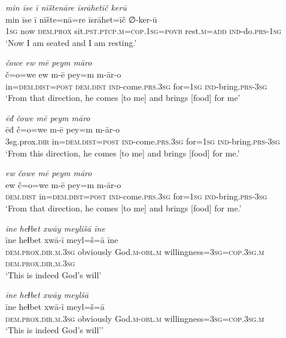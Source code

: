 \ea \label{PM.45}
\textit{min īse ī nīštenāre īsrāhetīč kerū} \\ 
\gll min īse ī nīšte=nā=re īsrāhet=īč ∅-ker-ū \\ 
 \textsc{1sg} now \textsc{dem.prox} sit\textsc{.pst}\textsc{.ptcp}\textsc{.m}\textsc{=cop}\textsc{.\textsc{1sg}}\textsc{=\textsc{povb}} rest\textsc{.m}\textsc{=add} \textsc{ind-}do\textsc{.prs}\textsc{-\textsc{1sg}} \\ 
\glt `Now I am seated and I am resting.'
\z 
 
\ea \label{PM.46}
\textit{čowe ew mē peym māro} \\ 
\gll č=o=we ew m-ē pey=m m-ār-o \\ 
 in=\textsc{dem.dist}\textsc{=\textsc{post}} \textsc{dem.dist} \textsc{ind-}come\textsc{.prs}\textsc{.3sg} for\textsc{=\textsc{1sg}} \textsc{ind-}bring\textsc{.prs}\textsc{-3sg} \\ 
\glt `From that direction, he  comes [to me] and brings [food] for me'
\z 
 
\ea \label{PM.47}
\textit{ēđ čowe mē peym māro} \\ 
\gll ēđ č=o=we m-ē pey=m m-ār-o \\ 
 3sg.prox\textsc{.dir} in=\textsc{dem.dist}\textsc{=\textsc{post}} \textsc{ind-}come\textsc{.prs}\textsc{.3sg} for\textsc{=\textsc{1sg}} \textsc{ind-}bring\textsc{.prs}\textsc{-3sg} \\ 
\glt `From this direction, he  comes [to me] and brings [food] for me.'
\z 
 
\ea \label{PM.48}
\textit{ew čowe mē peym māro} \\ 
\gll ew č=o=we m-ē pey=m m-ār-o \\ 
 \textsc{dem.dist} in=\textsc{dem.dist}\textsc{=\textsc{post}} \textsc{ind-}come\textsc{.prs}\textsc{.3sg} for\textsc{=\textsc{1sg}} \textsc{ind-}bring\textsc{.prs}\textsc{-3sg} \\ 
\glt `From that direction, he  comes [to me] and brings [food] for me.'
\z 
 
\ea \label{PM.51}
\textit{īne heɫbet xwāy meylišā īne} \\ 
\gll īne heɫbet xwā-ī meyl=š=ā īne \\ 
 \textsc{dem.prox}\textsc{.dir}\textsc{.m}\textsc{.3sg} obviously God\textsc{.m}\textsc{-obl}\textsc{.m} willingness\textsc{=3sg}\textsc{=cop}\textsc{.3sg}\textsc{.m} \textsc{dem.prox}\textsc{.dir}\textsc{.m}\textsc{.3sg} \\ 
\glt `This is indeed God’s will'
\z 
 
\ea \label{PM.52}
\textit{īne heɫbet xwāy meylšā} \\ 
\gll īne heɫbet xwā-ī meyl=š=ā \\ 
 \textsc{dem.prox}\textsc{.dir}\textsc{.m}\textsc{.3sg} obviously God\textsc{.m}\textsc{-obl}\textsc{.m} willingness\textsc{=3sg}\textsc{=cop}\textsc{.3sg}\textsc{.m} \\ 
\glt `This is indeed God’s will’'
\z 
 
